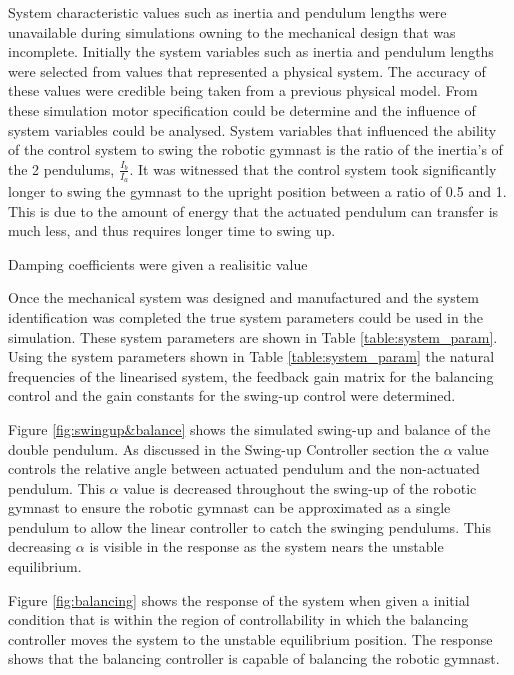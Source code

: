 \documentclass[a4paper,12pt]{article}
\begin{document}
	System characteristic values such as inertia and pendulum lengths were unavailable during simulations owning to the mechanical design that was incomplete. Initially the system variables such as inertia and pendulum lengths were selected from values that represented a physical system. The accuracy of these values were credible being taken from a previous physical model. From these simulation motor specification could be determine and the influence of system variables could be analysed. System variables that influenced the ability of the control system to swing the robotic gymnast is the ratio of the inertia's of the 2 pendulums, $\frac{I_{b}}{I_{a}}$. It was witnessed that the control system took significantly longer to swing the gymnast to the upright position between a ratio of 0.5 and 1. This is due to the amount of energy that the actuated pendulum can transfer is much less, and thus requires longer time to swing up.
	
	Damping coefficients were given a realisitic value
	
	Once the mechanical system was designed and manufactured and the system identification was completed the true system parameters could be used in the simulation. These system parameters are shown in Table \ref{table:system_param}. Using the system parameters shown in Table \ref{table:system_param} the natural frequencies of the linearised system, the feedback gain matrix for the balancing control and the gain constants for the swing-up control were determined. 
	
	Figure \ref{fig:swingup&balance} shows the simulated swing-up and balance of the double pendulum. As discussed in the Swing-up Controller section the $\alpha$ value controls the relative angle between actuated pendulum and the non-actuated pendulum. This $\alpha$ value is decreased throughout the swing-up of the robotic gymnast to ensure the robotic gymnast can be approximated as a single pendulum to allow the linear controller to catch the swinging pendulums. This decreasing $\alpha$ is visible in the response as the system nears the unstable equilibrium.
	
	Figure \ref{fig:balancing} shows the response of the system when given a initial condition that is within the region of controllability in which the balancing controller moves the system to the unstable equilibrium position. The response shows that the balancing controller is capable of balancing the robotic gymnast.
	
\end{document}
